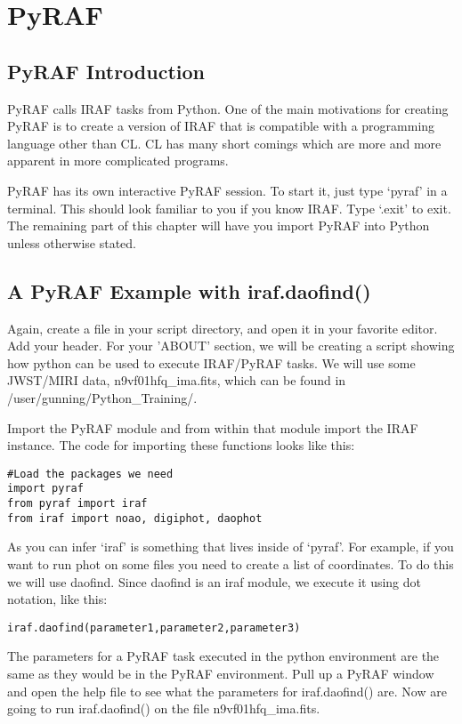 \chapter{PyRAF}
\label{ch:pyraf}
 
\section{PyRAF Introduction}

PyRAF calls IRAF tasks from Python.  One of the main motivations for
creating PyRAF is to create a version of IRAF that is compatible with
a programming language other than CL. CL has many short comings which
are more and more apparent in more complicated programs.

PyRAF has its own interactive PyRAF session.  To start it, just type
`pyraf' in a terminal.  This should look familiar to you if you know
IRAF.  Type `.exit' to exit.  The remaining part of this chapter will
have you import PyRAF into Python unless otherwise stated.

\section{A PyRAF Example with {\sf iraf.daofind()}}

Again, create a file in your script directory, and open it in your
favorite editor.  Add your header.  For your 'ABOUT' section, we will
be creating a script showing how python can be used to execute
IRAF/PyRAF tasks. We will use some JWST/MIRI data, n9vf01hfq\_ima.fits,
which can be found in /user/gunning/Python\_Training/.

Import the PyRAF module and from within that module import the IRAF
instance.  The code for importing these functions looks like this:

\begin{verbatim}
#Load the packages we need 
import pyraf 
from pyraf import iraf
from iraf import noao, digiphot, daophot
\end{verbatim}

As you can infer `iraf' is something that lives inside of `pyraf'.
For example, if you want to run {\sf\small phot} on some files you
need to create a list of coordinates.  To do this we will use
{\sf\small daofind}.  Since {\sf\small daofind} is an iraf module, we
execute it using dot notation, like this:

\texttt{iraf.daofind(parameter1,parameter2,parameter3)}

The parameters for a PyRAF task executed in the python environment are
the same as they would be in the PyRAF environment. Pull up a PyRAF
window and open the help file to see what the parameters for
{\sf\small iraf.daofind()} are. Now are going to run {\sf\small
  iraf.daofind()} on the file n9vf01hfq\_ima.fits.  

